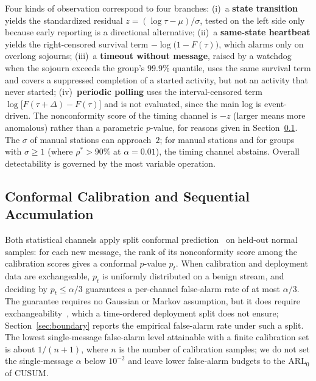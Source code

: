 \documentclass[manuscript,screen,review]{acmart}
\begin{document}
Four kinds of observation correspond to four branches: (i)~a \textbf{state transition} yields the standardized residual $z=(\log\tau-\mu)/\sigma$, tested on the left side only because early reporting is a directional alternative; (ii)~a \textbf{same-state heartbeat} yields the right-censored survival term $-\log\bigl(1-F(\tau)\bigr)$, which alarms only on overlong sojourns; (iii)~a \textbf{timeout without message}, raised by a watchdog when the sojourn exceeds the group's $99.9\%$ quantile, uses the same survival term and covers a suppressed completion of a started activity, but not an activity that never started; (iv)~\textbf{periodic polling} uses the interval-censored term $\log\bigl[F(\tau+\Delta)-F(\tau)\bigr]$ and is not evaluated, since the main log is event-driven.
The nonconformity score of the timing channel is $-z$ (larger means more anomalous) rather than a parametric $p$-value, for reasons given in Section~\ref{sec:conformal}. The $\sigma$ of manual stations can approach~$2$; for manual stations and for groups with $\sigma\ge1$ (where $\rho^*>90\%$ at $\alpha=0.01$), the timing channel abstains. Overall detectability is governed by the most variable operation.

\subsection{Conformal Calibration and Sequential Accumulation}
\label{sec:conformal}

Both statistical channels apply split conformal prediction~\cite{shafer2008conformal,angelopoulos2023conformal} on held-out normal samples: for each new message, the rank of its nonconformity score among the calibration scores gives a conformal $p$-value $p_t$. When calibration and deployment data are exchangeable, $p_t$ is uniformly distributed on a benign stream, and deciding by $p_t\le\alpha/3$ guarantees a per-channel false-alarm rate of at most $\alpha/3$. The guarantee requires no Gaussian or Markov assumption, but it does require exchangeability~\cite{barber2023exchangeability}, which a time-ordered deployment split does not ensure; Section~\ref{sec:boundary} reports the empirical false-alarm rate under such a split. The lowest single-message false-alarm level attainable with a finite calibration set is about $1/(n+1)$, where $n$ is the number of calibration samples; we do not set the single-message $\alpha$ below $10^{-2}$ and leave lower false-alarm budgets to the $\mathrm{ARL}_0$ of {CUSUM}.
\end{document}
